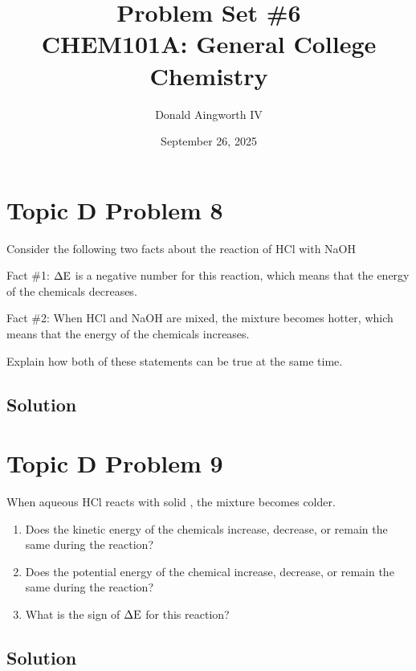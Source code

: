\documentclass[10pt]{article}
\title{
    Problem Set \#6
    \\  \small
    CHEM101A: General College Chemistry
    }
\author{Donald Aingworth IV}
\date{September 26, 2025}
\begin{document}

    \maketitle


    \pagebreak
    \section{Topic D Problem 8}
        Consider the following two facts about the reaction of HCl with NaOH
        
        Fact \#1: $\rm \Delta E$ is a negative number for this reaction, which means that the energy of the chemicals decreases.
        
        Fact \#2: When HCl and NaOH are mixed, the mixture becomes hotter, which means that the energy of the chemicals increases.
        
        Explain how both of these statements can be true at the same time.

        \subsection{Solution}

    \pagebreak
    \section{Topic D Problem 9}
        When aqueous HCl reacts with solid , the mixture becomes colder.
        \begin{enumerate}
            \item   Does the kinetic energy of the chemicals increase, decrease, or remain the same during the reaction?
            \item   Does the potential energy of the chemical increase, decrease, or remain the same during the reaction?
            \item   What is the sign of $\rm \Delta E$ for this reaction?
        \end{enumerate}
        
        \subsection{Solution}

    \pagebreak
\end{document}
